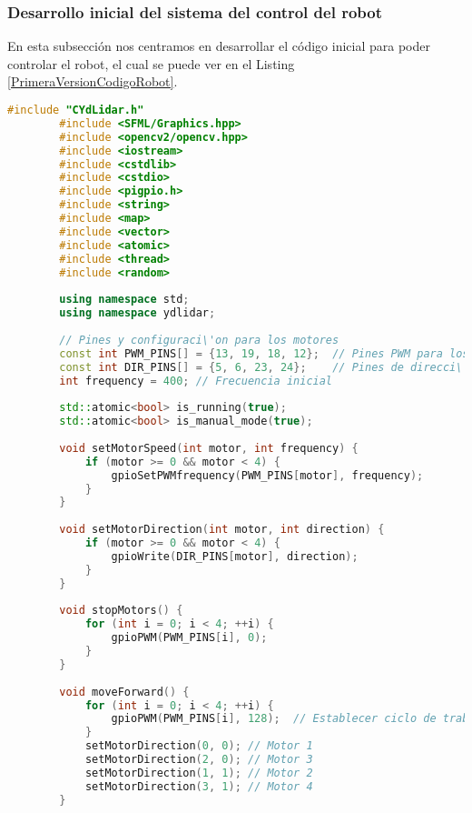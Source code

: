 \subsubsection{Desarrollo inicial del sistema del control del robot}
\label{sub:Desarrollo Inicial del Sistema del control del Robot}
    En esta subsecci\'on nos centramos en desarrollar el c\'odigo inicial para poder controlar el robot, el cual se puede ver en el Listing \ref{PrimeraVersionCodigoRobot}.
    \vskip 0.5cm
    \begin{lstlisting}[language={C++}, caption={Primera versi\'on del c\'odigo del sistema de control del robot}, label={PrimeraVersionCodigoRobot}]
        #include "CYdLidar.h"
        #include <SFML/Graphics.hpp>
        #include <opencv2/opencv.hpp>
        #include <iostream>
        #include <cstdlib>
        #include <cstdio>
        #include <pigpio.h>
        #include <string>
        #include <map>
        #include <vector>
        #include <atomic>
        #include <thread>
        #include <random>
        
        using namespace std;
        using namespace ydlidar;
        
        // Pines y configuraci\'on para los motores
        const int PWM_PINS[] = {13, 19, 18, 12};  // Pines PWM para los motores
        const int DIR_PINS[] = {5, 6, 23, 24};    // Pines de direcci\'on para los motores
        int frequency = 400; // Frecuencia inicial
        
        std::atomic<bool> is_running(true);
        std::atomic<bool> is_manual_mode(true);
        
        void setMotorSpeed(int motor, int frequency) {
            if (motor >= 0 && motor < 4) {
                gpioSetPWMfrequency(PWM_PINS[motor], frequency);
            }
        }
        
        void setMotorDirection(int motor, int direction) {
            if (motor >= 0 && motor < 4) {
                gpioWrite(DIR_PINS[motor], direction);
            }
        }
        
        void stopMotors() {
            for (int i = 0; i < 4; ++i) {
                gpioPWM(PWM_PINS[i], 0);
            }
        }
        
        void moveForward() {
            for (int i = 0; i < 4; ++i) {
                gpioPWM(PWM_PINS[i], 128);  // Establecer ciclo de trabajo al 50%
            }
            setMotorDirection(0, 0); // Motor 1
            setMotorDirection(2, 0); // Motor 3
            setMotorDirection(1, 1); // Motor 2
            setMotorDirection(3, 1); // Motor 4
        }
        

\end{lstlisting}
